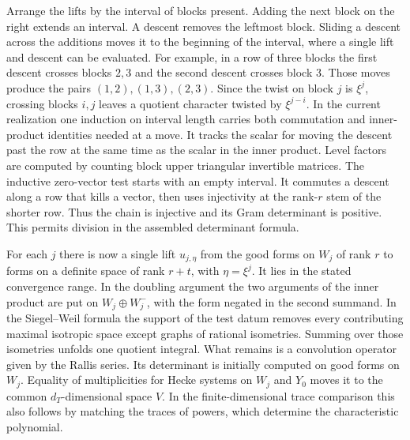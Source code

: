 Arrange the lifts by the interval of blocks present. Adding the next block on the right extends an interval. A descent removes the leftmost block. Sliding a descent across the additions moves it to the beginning of the interval, where a single lift and descent can be evaluated. For example, in a row of three blocks the first descent crosses blocks $2,3$ and the second descent crosses block $3$. Those moves produce the pairs $(1,2),(1,3),(2,3)$. Since the twist on block $j$ is $\xi^j$, crossing blocks $i,j$ leaves a quotient character twisted by $\xi^{j-i}$. In the current realization one induction on interval length carries both commutation and inner-product identities needed at a move. It tracks the scalar for moving the descent past the row at the same time as the scalar in the inner product. Level factors are computed by counting block upper triangular invertible matrices. The inductive zero-vector test starts with an empty interval. It commutes a descent along a row that kills a vector, then uses injectivity at the rank-$r$ stem of the shorter row. Thus the chain is injective and its Gram determinant is positive. This permits division in the assembled determinant formula.

For each $j$ there is now a single lift $u_{j,\eta}$ from the good forms on $W_j$ of rank $r$ to forms on a definite space of rank $r+t$, with $\eta=\xi^j$. It lies in the stated convergence range. In the doubling argument the two arguments of the inner product are put on $W_j\oplus W_j^-$, with the form negated in the second summand. In the Siegel--Weil formula the support of the test datum removes every contributing maximal isotropic space except graphs of rational isometries. Summing over those isometries unfolds one quotient integral. What remains is a convolution operator given by the Rallis series. Its determinant is initially computed on good forms on $W_j$. Equality of multiplicities for Hecke systems on $W_j$ and $Y_0$ moves it to the common $d_T$-dimensional space $V$. In the finite-dimensional trace comparison this also follows by matching the traces of powers, which determine the characteristic polynomial.


